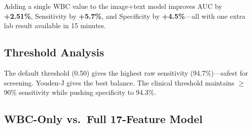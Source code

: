 \documentclass{article}
\begin{document}
Adding a single WBC value to the image+text model improves AUC by \textbf{+2.51\%},
Sensitivity by \textbf{+5.7\%}, and Specificity by \textbf{+4.5\%}---all with
one extra lab result available in 15 minutes.

\subsection{Threshold Analysis}

\begin{table}[h]
\centering\small
\caption{Phase~3c at three clinical decision thresholds ($N$\,=\,565).}
\label{tab:thresh}
\end{table}

The default threshold (0.50) gives the highest raw sensitivity (94.7\%)---safest
for screening. Youden-J gives the best balance. The clinical threshold maintains
$\geq$90\% sensitivity while pushing specificity to 94.3\%.

\subsection{WBC-Only vs.\ Full 17-Feature Model}

\begin{table}[h]
\centering\small
\caption{Phase~3c (1 feature) vs.\ full 17-feature model (Youden-J).}
\label{tab:compare}
\end{table}
\end{document}
